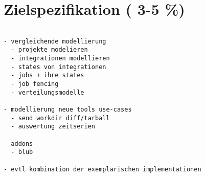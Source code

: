 \chapter{Zielspezifikation ( 3-5 \%)}

\begin{verbatim}

- vergleichende modellierung
  - projekte modelieren
  - integrationen modellieren
  - states von integrationen
  - jobs + ihre states
  - job fencing
  - verteilungsmodelle

- modellierung neue tools use-cases
  - send workdir diff/tarball
  - auswertung zeitserien

- addons
  - blub

- evtl kombination der exemplarischen implementationen


\end{verbatim}



